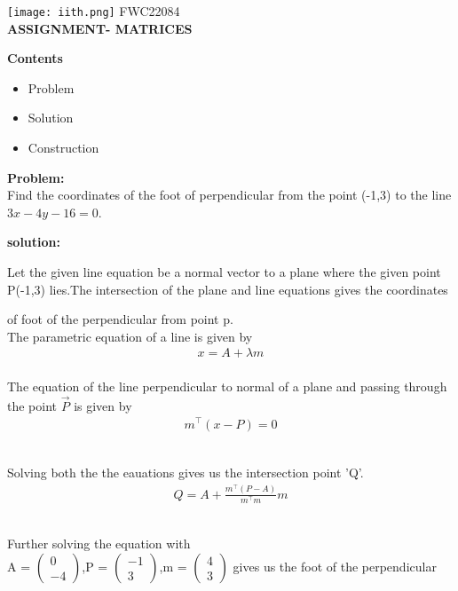 \documentclass[12pt,a4paper]{report}
\begin{document}
\raggedright{\texttt{[image: iith.png]}} \hspace{12cm}\raggedleft FWC22084\vspace{8mm}\\ 
 \centering \Large \textbf{ASSIGNMENT- MATRICES} \normalsize \vspace{15mm}
\begin{multicols}{2}
 \raggedright \large \textbf{Contents}\normalsize \vspace{2mm}
\begin{itemize}
 \raggedright \item Problem \item Solution\item Construction
\end{itemize}
 \raggedright \large \textbf{Problem:} \normalsize \hspace{2mm}
\\  Find the coordinates of the foot of perpendicular from the point (-1,3) to the line $3x-4y-16=0$.\vspace{2mm}
\\ \raggedright\textbf{solution:} \vspace{2mm}
 \\ \raggedright Let the given line equation be a normal vector to a plane where the given point P(-1,3) lies.The intersection of the plane and line equations gives the coordinates \raggedright of foot of the perpendicular from point p.\vspace{2mm}
  \\The parametric equation of a line  is given by  
\begin{align}
	x = A + \lambda m
\end{align}
  \\The equation of the line perpendicular to normal of a plane 
		and passing through the point $\vec{P}$ is given by 
\begin{align}
	m^{\top}(x-P)  = 0
\end{align}
\\\raggedright Solving both the the eauations gives us the intersection point 'Q'.
\begin{align}   
       Q = A + \frac{ m^{\top}(P-A)}{m^{\top}m}m  
\end{align}      
\\ \raggedright Further solving the equation with  
\\A = $\begin{pmatrix} 0\\-4 \end{pmatrix}$,P = $\begin{pmatrix} -1\\3 \end{pmatrix}$,m = $\begin{pmatrix} 4\\3 \end{pmatrix}$ gives us the foot of the perpendicular

\end{multicols}
\end{document}
